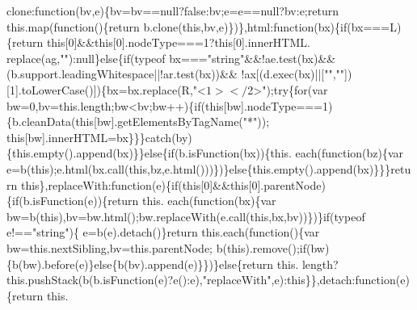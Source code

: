 \begin{DoxyCode}
      clone:\textcolor{keyword}{function}(bv,e)\{bv=bv==null?\textcolor{keyword}{false}:bv;e=e==null?bv:e;\textcolor{keywordflow}{return} this.map(\textcolor{keyword}{function}()\{\textcolor{keywordflow}{return} 
      b.clone(\textcolor{keyword}{this},bv,e)\})\},html:\textcolor{keyword}{function}(bx)\{\textcolor{keywordflow}{if}(bx===L)\{\textcolor{keywordflow}{return} \textcolor{keyword}{this}[0]&&\textcolor{keyword}{this}[0].nodeType===1?\textcolor{keyword}{this}[0].innerHTML.
      replace(ag,\textcolor{stringliteral}{""}):null\}\textcolor{keywordflow}{else}\{\textcolor{keywordflow}{if}(typeof bx===\textcolor{stringliteral}{"string"}&&!ae.test(bx)&&(b.support.leadingWhitespace||!ar.test(bx))&&
      !ax[(d.exec(bx)||[\textcolor{stringliteral}{""},\textcolor{stringliteral}{""}])[1].toLowerCase()])\{bx=bx.replace(R,\textcolor{stringliteral}{"<$1></$2>"});\textcolor{keywordflow}{try}\{\textcolor{keywordflow}{for}(var 
      bw=0,bv=this.length;bw<bv;bw++)\{\textcolor{keywordflow}{if}(\textcolor{keyword}{this}[bw].nodeType===1)\{b.cleanData(\textcolor{keyword}{this}[bw].getElementsByTagName(\textcolor{stringliteral}{"*"}));\textcolor{keyword}{
      this}[bw].innerHTML=bx\}\}\}\textcolor{keywordflow}{catch}(by)\{this.empty().append(bx)\}\}\textcolor{keywordflow}{else}\{\textcolor{keywordflow}{if}(b.isFunction(bx))\{this.
      each(\textcolor{keyword}{function}(bz)\{var e=b(\textcolor{keyword}{this});e.html(bx.call(\textcolor{keyword}{this},bz,e.html()))\})\}\textcolor{keywordflow}{else}\{this.empty().append(bx)\}\}\}\textcolor{keywordflow}{return} \textcolor{keyword}{
      this}\},replaceWith:\textcolor{keyword}{function}(e)\{\textcolor{keywordflow}{if}(\textcolor{keyword}{this}[0]&&\textcolor{keyword}{this}[0].parentNode)\{\textcolor{keywordflow}{if}(b.isFunction(e))\{\textcolor{keywordflow}{return} this.
      each(\textcolor{keyword}{function}(bx)\{var bw=b(\textcolor{keyword}{this}),bv=bw.html();bw.replaceWith(e.call(\textcolor{keyword}{this},bx,bv))\})\}\textcolor{keywordflow}{if}(typeof e!==\textcolor{stringliteral}{"string"})\{
      e=b(e).detach()\}\textcolor{keywordflow}{return} this.each(\textcolor{keyword}{function}()\{var bw=this.nextSibling,bv=this.parentNode;
      b(\textcolor{keyword}{this}).remove();\textcolor{keywordflow}{if}(bw)\{b(bw).before(e)\}\textcolor{keywordflow}{else}\{b(bv).append(e)\}\})\}\textcolor{keywordflow}{else}\{\textcolor{keywordflow}{return} this.
      length?this.pushStack(b(b.isFunction(e)?e():e),\textcolor{stringliteral}{"replaceWith"},e):\textcolor{keyword}{this}\}\},detach:\textcolor{keyword}{function}(e)\{\textcolor{keywordflow}{return} this.\textcolor{keyword}{
}
\end{DoxyCode}
